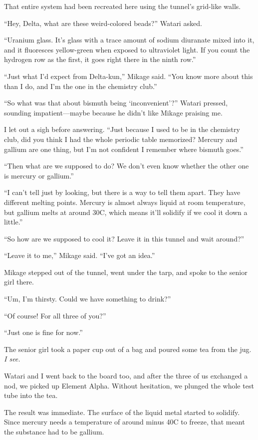 \documentclass[
    a4paper,
    12pt,
    twoside,
    openany,
    UTF8,
    fontset=windows
]{ctexbook}
\begin{document}
That entire system had been recreated here using the tunnel's grid-like walls.

``Hey, Delta, what are these weird-colored beads?'' Watari asked.

``Uranium glass. It's glass with a trace amount of sodium diuranate mixed into it, and it fluoresces yellow-green when exposed to ultraviolet light. If you count the hydrogen row as the first, it goes right there in the ninth row.''

``Just what I'd expect from Delta-kun,'' Mikage said. ``You know more about this than I do, and I'm the one in the chemistry club.''

``So what was that about bismuth being `inconvenient'?'' Watari pressed, sounding impatient---maybe because he didn't like Mikage praising me.

I let out a sigh before answering. ``Just because I used to be in the chemistry club, did you think I had the whole periodic table memorized? Mercury and gallium are one thing, but I'm not confident I remember where bismuth goes.''

``Then what are we supposed to do? We don't even know whether the other one is mercury or gallium.''

``I can't tell just by looking, but there is a way to tell them apart. They have different melting points. Mercury is almost always liquid at room temperature, but gallium melts at around 30\textdegree C, which means it'll solidify if we cool it down a little.''

``So how are we supposed to cool it? Leave it in this tunnel and wait around?''

``Leave it to me,'' Mikage said. ``I've got an idea.''

Mikage stepped out of the tunnel, went under the tarp, and spoke to the senior girl there.

``Um, I'm thirsty. Could we have something to drink?''

``Of course! For all three of you?''

``Just one is fine for now.''

The senior girl took a paper cup out of a bag and poured some tea from the jug. \textit{I see.}

Watari and I went back to the board too, and after the three of us exchanged a nod, we picked up Element Alpha. Without hesitation, we plunged the whole test tube into the tea.

The result was immediate. The surface of the liquid metal started to solidify. Since mercury needs a temperature of around minus 40\textdegree C to freeze, that meant the substance had to be gallium.
\end{document}
